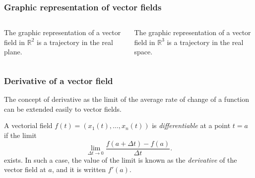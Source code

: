 \begin{frame}
\frametitle{Graphic representation of vector fields}

\begin{columns}
\begin{column}{0.5\textwidth}
The graphic representation of a vector field in $\mathbb{R}^2$ is a trajectory in the real plane.
\begin{center}

\end{center}
\end{column}
\begin{column}{0.5\textwidth}
The graphic representation of a vector field in $\mathbb{R}^3$ is a trajectory in the real space.
\begin{center}

\end{center}
\end{column}
\end{columns}
\end{frame}



\begin{frame}
\frametitle{Derivative of a vector field}
The concept of derivative as the limit of the average rate of change of a function can be extended easily to vector fields.

\begin{definition}
A vectorial field $f(t)=(x_1(t),\ldots,x_n(t))$ is \emph{differentiable} at a point $t=a$ if the limit
\[
\lim_{\Delta t\rightarrow 0} \frac{f(a+\Delta t)-f(a)}{\Delta t}.
\]
exists.
In such a case, the value of the limit is known as the \emph{derivative} of the vector field at $a$, and it is written $f'(a)$.
\end{definition}
\end{frame}



